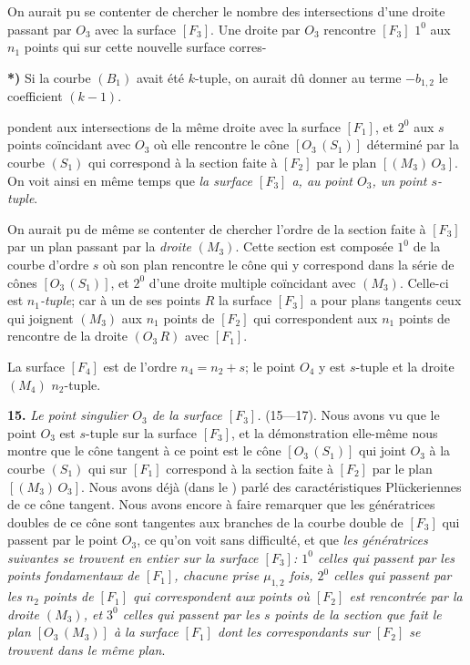 \documentclass{article}
\begin{document}
On aurait pu se contenter de chercher le nombre des intersections d'une droite passant par $O_3$ avec la surface $[F_3]$. Une droite par $O_3$ rencontre $[F_3]$ $1^0$ aux $n_1$ points qui sur cette nouvelle surface corres-

\textbf{*)} Si la courbe $(B_1)$ avait été $k$-tuple, on aurait dû donner au terme $- b_{1, 2}$ le coefficient $(k - 1)$.

pondent aux intersections de la même droite avec la surface $[F_1]$, et $2^0$ aux $s$ points coïncidant avec $O_3$ où elle rencontre le cône $[O_3\,(S_1)]$ déterminé par la courbe $(S_1)$ qui correspond à la section faite à $[F_2]$ par le plan $[(M_3)\,O_3]$. On voit ainsi en même temps que \emph{la surface $[F_3]$ a, au point $O_3$, un point $s$-tuple}.

On aurait pu de même se contenter de chercher l'ordre de la section faite à $[F_3]$ par un plan passant par la \emph{droite} $(M_3)$. Cette section est composée $1^0$ de la courbe d'ordre $s$ où son plan rencontre le cône qui y correspond dans la série de cônes $[O_3\,(S_1)]$, et $2^0$ d'une droite multiple coïncidant avec $(M_3)$. Celle-ci est \emph{$n_1$-tuple}; car à un de ses points $R$ la surface $[F_3]$ a pour plans tangents ceux qui joignent $(M_3)$ aux $n_1$ points de $[F_2]$ qui correspondent aux $n_1$ points de rencontre de la droite $(O_3\,R)$ avec $[F_1]$.

La surface $[F_4]$ est de l'ordre $n_4 = n_2 + s$; le point $O_4$ y est $s$-tuple et la droite $(M_4)$ $n_2$-tuple.

\textbf{15.} \emph{Le point singulier $O_3$ de la surface $[F_3]$.} (15---17). Nous avons vu que le point $O_3$ est $s$-tuple sur la surface $[F_3]$, et la démonstration elle-même nous montre que le cône tangent à ce point est le cône $[O_3\,(S_1)]$ qui joint $O_3$ à la courbe $(S_1)$ qui sur $[F_1]$ correspond à la section faite à $[F_2]$ par le plan $[(M_3)\,O_3]$. Nous avons déjà (dans le ) parlé des caractéristiques Plückeriennes de ce cône tangent. Nous avons encore à faire remarquer que les génératrices doubles de ce cône sont tangentes aux branches de la courbe double de $[F_3]$ qui passent par le point $O_3$, ce qu'on voit sans difficulté, et que \emph{les génératrices suivantes se trouvent en entier sur la surface $[F_3]$: $1^0$ celles qui passent par les points fondamentaux de $[F_1]$, chacune prise $\mu_{1, 2}$ fois, $2^0$ celles qui passent par les $n_2$ points de $[F_1]$ qui correspondent aux points où $[F_2]$ est rencontrée par la droite $(M_3)$, et $3^0$ celles qui passent par les $s$ points de la section que fait le plan $[O_3\,(M_3)]$ à la surface $[F_1]$ dont les correspondants sur $[F_2]$ se trouvent dans le même plan}.
\end{document}
